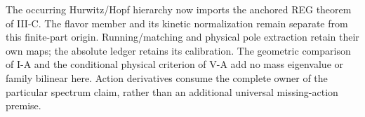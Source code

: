 \documentclass[12pt,a4paper]{article}
\begin{document}
\begin{remark}
\label{p6:rem:m8-batch-spectrum-inputs}
The occurring Hurwitz/Hopf hierarchy now imports the anchored
REG theorem of III-C.  The flavor member and its kinetic
normalization remain separate from this finite-part origin.
Running/matching and physical pole extraction retain their
own maps; the absolute ledger retains its calibration.
The geometric comparison of I-A and the conditional physical
criterion of V-A add no mass eigenvalue or family bilinear here.
Action derivatives consume the complete owner of the particular
spectrum claim, rather than an additional universal missing-action
premise.
\end{remark}
\end{document}
